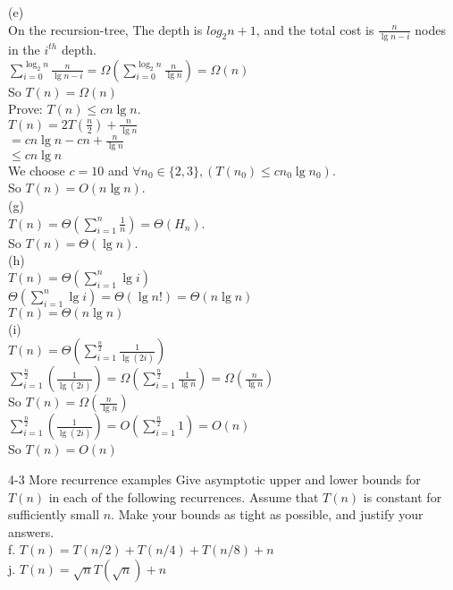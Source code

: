 \documentclass[a4paper, justified]{tufte-handout}
\begin{document}
\begin{solution}
\noindent(e)\\
On the  recursion-tree, The depth is  $log_2{n}+1$, and the total cost is  $\frac{n}{\lg n-i}$ nodes in the $i^{th}$ depth.\\  
$\sum\limits_{i=0}^{\log_2n} \frac{n}{\lg n-i}=\Omega(\sum\limits_{i=0}^{\log_2n} \frac{n}{\lg n})=\Omega(n)$\\
So $T(n)=\Omega(n)$\\
Prove: $T(n)\leq cn\lg n$.\\
$T(n)=2T(\frac{n}{2})+\frac{n}{\lg n}$\\
\hspace*{2.5em}$=cn\lg n-cn+\frac{n}{\lg n}$\\
\hspace*{2.5em}$\leq cn\lg n$\\
We choose $c=10$ and $\forall n_0\in\{2,3\},(T(n_0)\leq cn_0\lg n_0)$.\\
So $T(n)=O(n\lg n)$.\\

\noindent(g)\\
$T(n)=\Theta(\sum\limits_{i=1}^{n}\frac{1}{n})=\Theta(H_n)$.\\
So $T(n)=\Theta(\lg n)$.\\

\noindent(h)\\
 $T(n)=\Theta(\sum\limits_{i=1}^{n}\lg i)$\\
 $\Theta(\sum\limits_{i=1}^{n}\lg i)=\Theta(\lg n!)=\Theta(n\lg n)$\\
 $T(n)=\Theta(n\lg n)$\\
 
 \noindent(i)\\
  $T(n)=\Theta(\sum\limits_{i=1}^{\frac{n}{2}}\frac{1}{\lg (2i)})$\\
$\sum\limits_{i=1}^{\frac{n}{2}}(\frac{1}{\lg (2i)})=\Omega(\sum\limits_{i=1}^{\frac{n}{2}}\frac{1}{\lg n})=\Omega(\frac{n}{\lg n})$\\
 So $T(n)=\Omega(\frac{n}{\lg n})$\\
$\sum\limits_{i=1}^{\frac{n}{2}}(\frac{1}{\lg (2i)})=O(\sum\limits_{i=1}^{\frac{n}{2}}1)=O(n)$\\	
So $T(n)=O(n)$
\end{solution}

\beginoptional

\begin{problem}
4-3 More recurrence examples Give asymptotic upper and lower bounds for $T(n)$ in each of the following recurrences. Assume that $T(n)$ is constant for sufficiently small $n .$ Make your bounds as tight as possible, and justify your answers.\\
f. $T(n)=T(n / 2)+T(n / 4)+T(n / 8)+n$\\
j. $T(n)=\sqrt{n} T(\sqrt{n})+n$
\end{problem}
\end{document}
